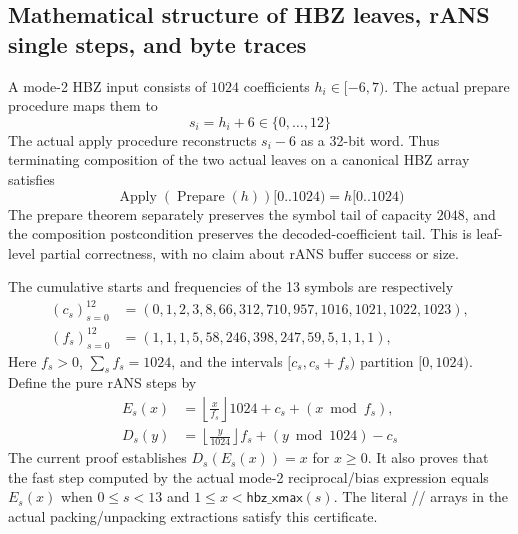\subsection{Mathematical structure of HBZ leaves, rANS single steps, and byte traces}

A mode-2 HBZ input consists of \(1024\) coefficients \(h_i\in[-6,7)\).
The actual prepare procedure maps them to
\[
  s_i=h_i+6\in\{0,\ldots,12\}
\]
The actual apply procedure reconstructs \(s_i-6\) as a 32-bit word. Thus
terminating composition of the two actual leaves on a canonical HBZ array satisfies
\[
  \operatorname{Apply}(\operatorname{Prepare}(h))[0..1024)=h[0..1024)
\]
The prepare theorem separately preserves the symbol tail of capacity
\(2048\), and the composition postcondition preserves the decoded-coefficient
tail. This is leaf-level partial correctness, with no claim about rANS buffer
success or size.

The cumulative starts and frequencies of the 13 symbols are respectively
\[
\begin{aligned}
(c_s)_{s=0}^{12}
  &=(0,1,2,3,8,66,312,710,957,1016,1021,1022,1023),\\
(f_s)_{s=0}^{12}
  &=(1,1,1,5,58,246,398,247,59,5,1,1,1),
\end{aligned}
\]
Here \(f_s>0\), \(\sum_s f_s=1024\), and the intervals
\([c_s,c_s+f_s)\) partition \([0,1024)\). Define the pure rANS steps by
\[
\begin{aligned}
  E_s(x)&=\left\lfloor\frac{x}{f_s}\right\rfloor 1024
           +c_s+(x\bmod f_s),\\
  D_s(y)&=\left\lfloor\frac{y}{1024}\right\rfloor f_s
           +(y\bmod 1024)-c_s
\end{aligned}
\]
The current proof establishes \(D_s(E_s(x))=x\) for \(x\ge0\). It also proves
that the fast step computed by the actual mode-2 reciprocal/bias expression
equals \(E_s(x)\) when \(0\le s<13\) and
\(1\le x<\mathsf{hbz\_xmax}(s)\). The literal
// arrays
in the actual packing/unpacking extractions satisfy this certificate.

